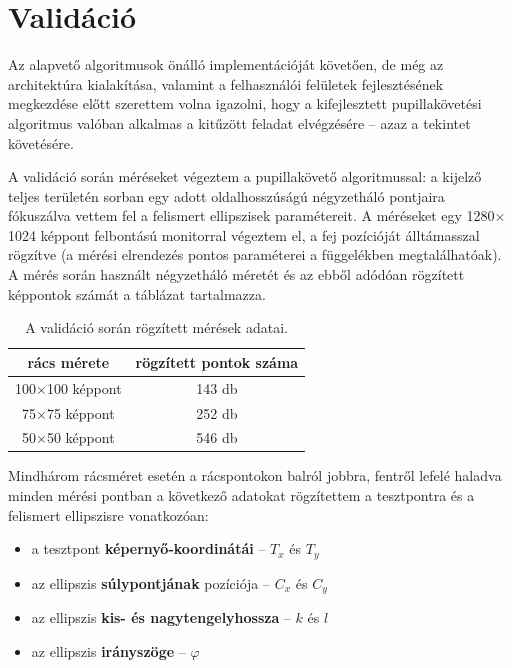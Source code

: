 \section{Validáció}\label{sect:validacio}

Az alapvető algoritmusok önálló implementációját követően, de még az architektúra kialakítása, valamint a felhasználói felületek fejlesztésének megkezdése előtt szerettem volna igazolni, hogy a kifejlesztett pupillakövetési algoritmus valóban alkalmas a kitűzött feladat elvégzésére -- azaz a tekintet követésére.

A validáció során méréseket végeztem a pupillakövető algoritmussal: a kijelző teljes területén sorban egy adott oldalhosszúságú négyzetháló pontjaira fókuszálva vettem fel a felismert ellipszisek paramétereit. A méréseket egy 1280$\times$1024 képpont felbontású monitorral végeztem el, a fej pozícióját álltámasszal rögzítve (a mérési elrendezés pontos paraméterei a  függelékben megtalálhatóak). A mérés során használt négyzetháló méretét és az ebből adódóan rögzített képpontok számát a  táblázat tartalmazza.

\begin{table}[ht]
	\centering
	\caption{A validáció során rögzített mérések adatai.} \label{tab:meresi_pontok}
	\begin{tabular}{ c | c }
	rács mérete & rögzített pontok száma \\ \hline \hline
	100$\times$100 képpont & 143 db \\
	75$\times$75 képpont & 252 db \\
	50$\times$50 képpont & 546 db \\
	\end{tabular}
\end{table}

Mindhárom rácsméret esetén a rácspontokon balról jobbra, fentről lefelé haladva minden mérési pontban a következő adatokat rögzítettem a tesztpontra és a felismert ellipszisre vonatkozóan:

\begin{itemize}
  \item a tesztpont \textbf{képernyő-koordinátái} -- $T_x$ és $T_y$
  \item az ellipszis \textbf{súlypontjának} pozíciója -- $C_x$ és $C_y$
  \item az ellipszis \textbf{kis- és nagytengelyhossza} -- $k$ és $l$
  \item az ellipszis \textbf{irányszöge} -- $\varphi$
\end{itemize}

